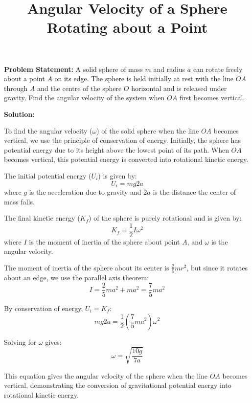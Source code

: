 \documentclass{article}
\begin{document}
\title{Angular Velocity of a Sphere Rotating about a Point}
\date{}
\maketitle

\textbf{Problem Statement:} A solid sphere of mass $m$ and radius $a$ can rotate freely about a point $A$ on its edge. The sphere is held initially at rest with the line $OA$ through $A$ and the centre of the sphere $O$ horizontal and is released under gravity. Find the angular velocity of the system when $OA$ first becomes vertical.

\textbf{Solution:}

To find the angular velocity (\(\omega\)) of the solid sphere when the line \(OA\) becomes vertical, we use the principle of conservation of energy. Initially, the sphere has potential energy due to its height above the lowest point of its path. When \(OA\) becomes vertical, this potential energy is converted into rotational kinetic energy.

The initial potential energy (\(U_i\)) is given by:
\[ U_i = mg2a \]
where \(g\) is the acceleration due to gravity and \(2a\) is the distance the center of mass falls.

The final kinetic energy (\(K_f\)) of the sphere is purely rotational and is given by:
\[ K_f = \frac{1}{2}I\omega^2 \]
where \(I\) is the moment of inertia of the sphere about point \(A\), and \(\omega\) is the angular velocity.

The moment of inertia of the sphere about its center is \(\frac{2}{5}mr^2\), but since it rotates about an edge, we use the parallel axis theorem:
\[ I = \frac{2}{5}ma^2 + ma^2 = \frac{7}{5}ma^2 \]

By conservation of energy, \(U_i = K_f\):
\[ mg2a = \frac{1}{2}\left(\frac{7}{5}ma^2\right)\omega^2 \]

Solving for \(\omega\) gives:
\[ \omega = \sqrt{\frac{10g}{7a}} \]

This equation gives the angular velocity of the sphere when the line \(OA\) becomes vertical, demonstrating the conversion of gravitational potential energy into rotational kinetic energy.
\end{document}

